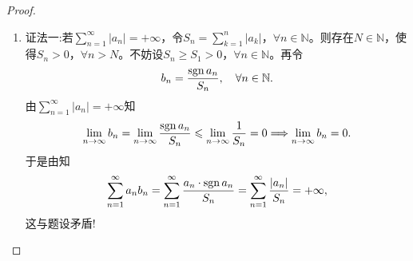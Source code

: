 \documentclass[../../main.tex]{subfiles}%
\begin{document}
\begin{proof}
\begin{enumerate}[(1)]
\item {\color{blue}证法一:}若$\sum\limits_{n=1}^{\infty} |a_n| = +\infty$，令$S_n = \sum\limits_{k=1}^{n} |a_k|$，$\forall n\in \mathbb{N}$。则存在$N\in \mathbb{N}$，使得$S_n > 0$，$\forall n > N$。不妨设$S_n \geqslant S_1 > 0$，$\forall n\in \mathbb{N}$。再令
\begin{align*}
b_n = \frac{\operatorname{sgn} a_n}{S_n},\quad \forall n\in \mathbb{N}.
\end{align*}
由$\sum\limits_{n=1}^{\infty} |a_n| = +\infty$知
\begin{align*}
\lim\limits_{n\to\infty} b_n = \lim\limits_{n\to\infty} \frac{\operatorname{sgn} a_n}{S_n} \leqslant \lim\limits_{n\to\infty} \frac{1}{S_n} = 0 \Longrightarrow \lim\limits_{n\to\infty} b_n = 0.
\end{align*}
于是由知
\begin{align*}
\sum\limits_{n=1}^{\infty} a_n b_n = \sum\limits_{n=1}^{\infty} \frac{a_n\cdot \operatorname{sgn} a_n}{S_n} = \sum\limits_{n=1}^{\infty} \frac{|a_n|}{S_n} = +\infty,
\end{align*}
这与题设矛盾!


\end{enumerate}
\end{proof}
\end{document}
